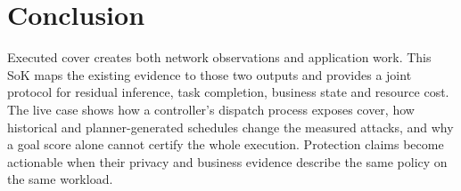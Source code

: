 \section{Conclusion}
Executed cover creates both network observations and application work. This SoK maps the existing evidence to those two outputs and provides a joint protocol for residual inference, task completion, business state and resource cost. The live case shows how a controller's dispatch process exposes cover, how historical and planner-generated schedules change the measured attacks, and why a goal score alone cannot certify the whole execution. Protection claims become actionable when their privacy and business evidence describe the same policy on the same workload.
